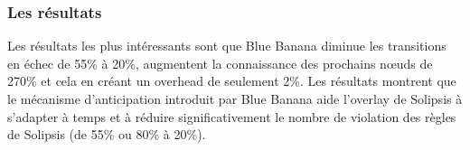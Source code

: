 		\subsubsection{Les résultats}
		Les résultats les plus intéressants sont que Blue Banana diminue les transitions en échec de 55\% à 20\%, augmentent la connaissance des prochains nœuds de 270\% et cela en créant un overhead de seulement 2\%. Les résultats montrent que le mécanisme d'anticipation introduit par Blue Banana aide l'overlay de Solipsis à s'adapter à temps et à réduire significativement le nombre de violation des règles de Solipsis (de 55\% ou 80\% à 20\%). 

